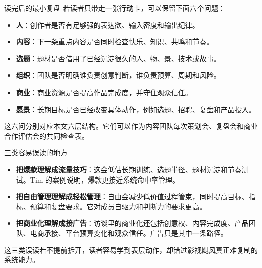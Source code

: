 \documentclass[a4paper]{article}
\begin{document}
\begin{importantbox}{读完后的最小复盘}
若读者只带走一张行动卡，可以保留下面六个问题：
\begin{itemize}
  \item \textbf{人}：创作者是否有足够强的表达欲、输入密度和输出纪律。
  \item \textbf{内容}：下一条重点内容是否同时检查快乐、知识、共鸣和节奏。
  \item \textbf{选题}：题材是否借用了已经沉淀很久的人、物、景、技术或故事。
  \item \textbf{组织}：团队是否明确谁负责创意判断，谁负责预算、周期和风险。
  \item \textbf{商业}：商业资源是否提高作品完成度，并守住观众信任。
  \item \textbf{愿景}：长期目标是否已经改变具体动作，例如选题、招聘、复盘和产品投入。
\end{itemize}
这六问分别对应本文六层结构。它们可以作为内容团队每次策划会、复盘会和商业合作评估会的共同检查表。
\end{importantbox}

\begin{knowledgebox}{三类容易误读的地方}
\begin{itemize}
  \item \textbf{把爆款理解成流量技巧}：这会低估长期训练、选题半径、题材沉淀和节奏测试。Tim 的案例说明，爆款更接近系统命中率管理。
  \item \textbf{把自由管理理解成轻松管理}：自由会减少低价值过程管束，同时提高目标、指标、预算和复盘要求。它对成员自驱力和判断力的要求更高。
  \item \textbf{把商业化理解成接广告}：访谈里的商业化还包括创意权、内容完成度、产品团队、电商承接、平台预算变化和观众信任。广告只是其中一条路径。
\end{itemize}
这三类误读若不提前拆开，读者容易学到表层动作，却错过影视飓风真正难复制的系统能力。
\end{knowledgebox}
\end{document}
